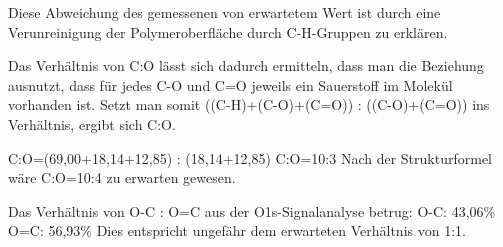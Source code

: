 \documentclass{article}
\begin{document}
Diese Abweichung des gemessenen von erwartetem Wert ist durch eine Verunreinigung der Polymeroberfläche durch C-H-Gruppen zu erklären. 

Das Verhältnis von C:O lässt sich dadurch ermitteln, dass man die Beziehung ausnutzt, dass für jedes C-O und C=O jeweils ein Sauerstoff im Molekül vorhanden ist. Setzt man somit 
 ((C-H)+(C-O)+(C=O)) : ((C-O)+(C=O)) ins Verhältnis, ergibt sich C:O. 

C:O=(69,00+18,14+12,85) : (18,14+12,85)
C:O=10:3
Nach der Strukturformel wäre C:O=10:4 zu erwarten gewesen.

Das Verhältnis von O-C : O=C aus der O1s-Signalanalyse betrug:
O-C:	43,06\%	
O=C:	56,93\%
Dies entspricht ungefähr dem erwarteten Verhältnis von 1:1. 



\end{document}
